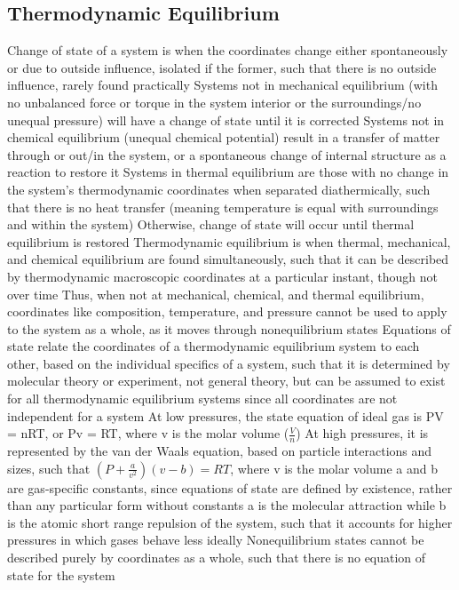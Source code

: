 \documentclass[11 pt, twoside]{article}
\newenvironment{outline*}
{
	\begin{outline}[enumerate]
	}
	{\end{outline}
}
\begin{document}
\subsection{Thermodynamic Equilibrium}
\begin{outline*}
\1 Change of state of a system is when the coordinates change either spontaneously or due to outside influence, isolated if the former, such that there is no outside influence, rarely found practically
\2 Systems not in mechanical equilibrium (with no unbalanced force or torque in the system interior or the surroundings/no unequal pressure) will have a change of state until it is corrected
\2 Systems not in chemical equilibrium (unequal chemical potential) result in a transfer of matter through or out/in the system, or a spontaneous change of internal structure as a reaction to restore it
\2 Systems in thermal equilibrium are those with no change in the system's thermodynamic coordinates when separated diathermically, such that there is no heat transfer (meaning temperature is equal with surroundings and within the system)
\3 Otherwise, change of state will occur until thermal equilibrium is restored
\1 Thermodynamic equilibrium is when thermal, mechanical, and chemical equilibrium are found simultaneously, such that it can be described by thermodynamic macroscopic coordinates at a particular instant, though not over time
\2 Thus, when not at mechanical, chemical, and thermal equilibrium, coordinates like composition, temperature, and pressure cannot be used to apply to the system as a whole, as it moves through nonequilibrium states
\1 Equations of state relate the coordinates of a thermodynamic equilibrium system to each other, based on the individual specifics of a system, such that it is determined by molecular theory or experiment, not general theory, but can be assumed to exist for all thermodynamic equilibrium systems since all coordinates are not independent for a system
\2 At low pressures, the state equation of ideal gas is PV = nRT, or Pv = RT, where v is the molar volume ($\frac{V}{n}$)
\2 At high pressures, it is represented by the van der Waals equation, based on particle interactions and sizes, such that $(P + \frac{a}{v^2})(v - b) = RT$, where v is the molar volume
\3 a and b are gas-specific constants, since equations of state are defined by existence, rather than any particular form without constants
\3 a is the molecular attraction while b is the atomic short range repulsion of the system, such that it accounts for higher pressures in which gases behave less ideally 
\2 Nonequilibrium states cannot be described purely by coordinates as a whole, such that there is no equation of state for the system
\end{outline*}
\end{document}
